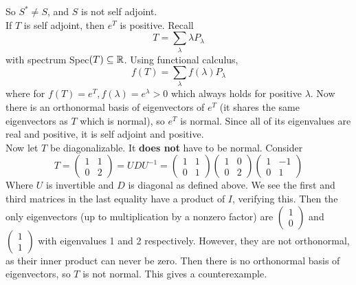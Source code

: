 \documentclass[answers]{exam}
\begin{document}
\begin{questions}
\begin{solution}
	So $S^* \neq S$, and $S$ is not self adjoint. \\
	If $T$ is self adjoint, then $e^T$ is positive. Recall
	$$T = \sum_\lambda \lambda P_\lambda$$
	with spectrum Spec$(T) \subseteq \mathbb{R}$. Using functional calculus,
	$$f(T) = \sum_\lambda f(\lambda) P_\lambda$$
	where for $f(T) = e^T, f(\lambda) = e^\lambda > 0$
	which always holds for positive $\lambda$. Now there is an orthonormal basis of eigenvectors of $e^T$ (it shares the same eigenvectors as $T$ which is normal), so $e^T$ is normal. Since all of its eigenvalues are real and positive, it is self adjoint and positive. \\
	Now let $T$ be diagonalizable. It \textbf{does not} have to be normal. Consider
	$$T = \begin{pmatrix} 1 & 1 \\ 0 & 2 \end{pmatrix} = UDU^{-1} = \begin{pmatrix} 1 & 1 \\ 0 & 1 \end{pmatrix} \begin{pmatrix} 1 & 0 \\ 0 & 2 \end{pmatrix} \begin{pmatrix} 1 & -1 \\ 0 & 1 \end{pmatrix}$$
	Where $U$ is invertible and $D$ is diagonal as defined above. We see the first and third matrices in the last equality have a product of $I$, verifying this. Then the only eigenvectors (up to multiplication by a nonzero factor) are $\begin{pmatrix} 1 \\ 0 \end{pmatrix}$ and $\begin{pmatrix} 1 \\ 1 \end{pmatrix}$ with eigenvalues 1 and 2 respectively. However, they are not orthonormal, as their inner product can never be zero. Then there is no orthonormal basis of eigenvectors, so $T$ is not normal. This gives a counterexample.
\end{solution}

\end{questions}
\end{document}
